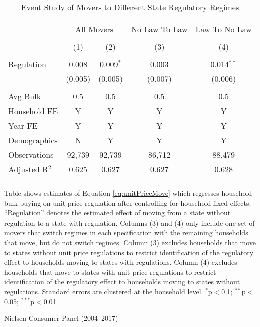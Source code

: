 \begin{table}[!htbp] \centering
  \caption{Event Study of Movers to Different State Regulatory Regimes}
  \label{tab:unitPriceLawMovers}
\begin{tabular}{@{\extracolsep{5pt}}lcccc}
\\[-1.8ex]\hline
\hline \\[-1.8ex]
 & \multicolumn{2}{c}{All Movers} & No Law To Law & Law To No Law \\
\\[-1.8ex] & (1) & (2) & (3) & (4)\\
\hline \\[-1.8ex]
 Regulation & 0.008 & 0.009$^{*}$ & 0.003 & 0.014$^{**}$ \\
  & (0.005) & (0.005) & (0.007) & (0.006) \\
 \hline \\[-1.8ex]
Avg Bulk & 0.5 & 0.5 & 0.5 & 0.5 \\
Household FE & Y & Y & Y & Y \\
Year FE & Y & Y & Y & Y \\
Demographics & N & Y & Y & Y \\
Observations & 92,739 & 92,739 & 86,712 & 88,479 \\
Adjusted R$^{2}$ & 0.625 & 0.627 & 0.627 & 0.628 \\
\hline
\hline \\[-1.8ex]
\end{tabular}
\begin{tablenotes}
Table shows estimates of Equation \ref{eq:unitPriceMove} which regresses household bulk buying on unit price regulation after controlling for household fixed effects. ``Regulation'' denotes the estimated effect of moving from a state without regulation to a state with regulation. Columns (3) and (4) only include one set of movers that switch regimes in each specification with the remaining households that move, but do not switch regimes. Column (3) excludes households that move to states without unit price regulations to restrict identification of the regulatory effect to households moving to states with regulations. Column (4) excludes households that move to states with unit price regulations to restrict identification of the regulatory effect to households moving to states without regulations. Standard errors are clustered at the household level. $^{*}$p$<$0.1; $^{**}$p$<$0.05; $^{***}$p$<$0.01
\end{tablenotes}
\begin{tablenotes}[Source]
Nielsen Consumer Panel (2004--2017)
\end{tablenotes}
\end{table}
